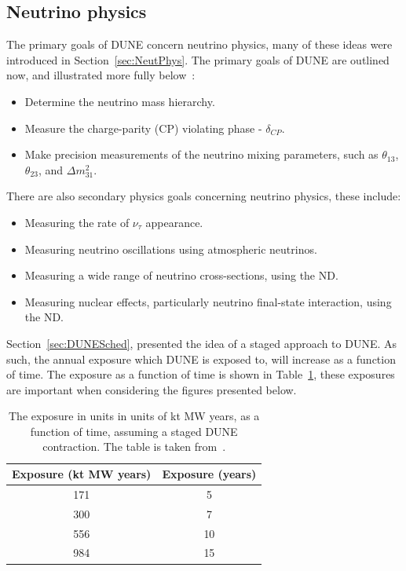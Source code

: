 \subsection{Neutrino physics} \label{sec:DUNEPhys_Neut} %
The primary goals of DUNE concern neutrino physics, many of these ideas were introduced in Section~\ref{sec:NeutPhys}. The primary goals of DUNE are outlined now, and illustrated more fully below~\citep{DUNECDR_V2}:
\begin{itemize}
\item Determine the neutrino mass hierarchy.
\item Measure the charge-parity (CP) violating phase - $\delta_{CP}$.
\item Make precision measurements of the neutrino mixing parameters, such as $\theta_{13}$, $\theta_{23}$, and $\Delta m^{2}_{31}$.
\end{itemize}
There are also secondary physics goals concerning neutrino physics, these include:
\begin{itemize}
\item Measuring the rate of $\nu_{\tau}$ appearance.
\item Measuring neutrino oscillations using atmospheric neutrinos.
\item Measuring a wide range of neutrino cross-sections, using the ND.
\item Measuring nuclear effects, particularly neutrino final-state interaction, using the ND.
\end{itemize}
Section~\ref{sec:DUNESched}, presented the idea of a staged approach to DUNE. As such, the annual exposure which DUNE is exposed to, will increase as a function of time. The exposure as a function of time is shown in Table~\ref{tab:DUNEExposure}, these exposures are important when considering the figures presented below. \\

\begin{table}
\caption[The exposure in units in units of kt MW years, as a function of time, assuming a staged DUNE construction]
        {The exposure in units in units of kt MW years, as a function of time, assuming a staged DUNE contraction. The table is taken from~\citep{Elizabeth_01_17}.}
\centering
\label{tab:DUNEExposure}
\begin{tabular}{c c}
\toprule
{Exposure (kt MW years)} & {Exposure (years)} \\
\midrule
171                      & 5 \\

300                      & 7 \\

556                      & 10 \\

984                      & 15 \\
\bottomrule
\end{tabular}
\end{table}

